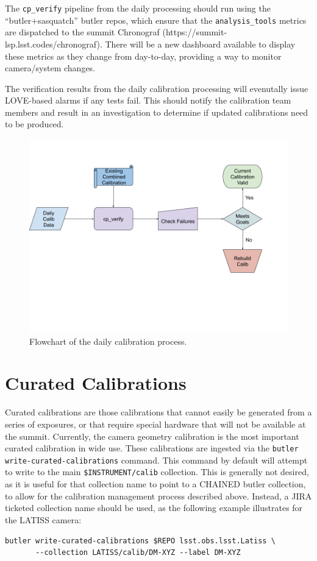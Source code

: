\documentclass[DM,authoryear,toc]{lsstdoc}
\begin{document}
The \verb|cp_verify| pipeline from the daily processing should run using the ``butler+sasquatch'' butler repos, which ensure that the \verb|analysis_tools| metrics are dispatched to the summit Chronograf (https://summit-lsp.lsst.codes/chronograf).
There will be a new dashboard available to display these metrics as they change from day-to-day, providing a way to monitor camera/system changes.

The verification results from the daily calibration processing will evenutally issue LOVE-based alarms if any tests fail.
This should notify the calibration team members and result in an investigation to determine if updated calibrations need to be produced.

\begin{figure}
  \includegraphics[width=\linewidth]{figures/daily_processing.png}
  \caption{Flowchart of the daily calibration process.}
  \label{fig:daily}
\end{figure}

\section{Curated Calibrations}

Curated calibrations are those calibrations that cannot easily be generated from a series of exposures, or that require special hardware that will not be available at the summit.
Currently, the camera geometry calibration is the most important curated calibration in wide use.
These calibrations are ingested via the \verb|butler write-curated-calibrations| command.
This command by default will attempt to write to the main \verb|$INSTRUMENT/calib| collection.
This is generally not desired, as it is useful for that collection name to point to a CHAINED butler collection, to allow for the calibration management process described above.
Instead, a JIRA ticketed collection name should be used, as the following example illustrates for the LATISS camera:
\begin{verbatim}
butler write-curated-calibrations $REPO lsst.obs.lsst.Latiss \
       --collection LATISS/calib/DM-XYZ --label DM-XYZ
\end{verbatim}
\end{document}
